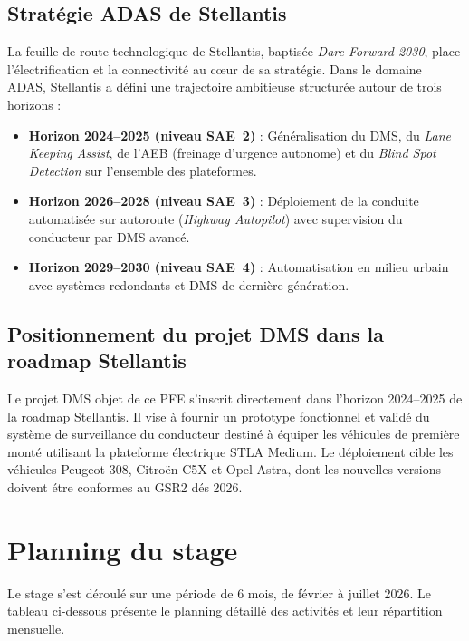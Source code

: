 \documentclass[12pt,a4paper]{report}
\begin{document}
\subsection{Strat\'egie ADAS de Stellantis}

La feuille de route technologique de Stellantis, baptis\'ee \textit{Dare Forward 2030}, place l'\'electrification et la connectivit\'e au c\oe ur de sa strat\'egie. Dans le domaine ADAS, Stellantis a d\'efini une trajectoire ambitieuse structur\'ee autour de trois horizons :

\begin{itemize}
  \item \textbf{Horizon 2024--2025 (niveau SAE~2)} : G\'en\'eralisation du DMS, du \textit{Lane Keeping Assist}, de l'AEB (freinage d'urgence autonome) et du \textit{Blind Spot Detection} sur l'ensemble des plateformes.
  \item \textbf{Horizon 2026--2028 (niveau SAE~3)} : D\'eploiement de la conduite automatis\'ee sur autoroute (\textit{Highway Autopilot}) avec supervision du conducteur par DMS avanc\'e.
  \item \textbf{Horizon 2029--2030 (niveau SAE~4)} : Automatisation en milieu urbain avec syst\`emes redondants et DMS de derni\`ere g\'en\'eration.
\end{itemize}

\subsection{Positionnement du projet DMS dans la roadmap Stellantis}

Le projet DMS objet de ce PFE s'inscrit directement dans l'horizon 2024--2025 de la roadmap Stellantis. Il vise \`a fournir un prototype fonctionnel et valid\'e du syst\`eme de surveillance du conducteur destin\'e \`a \'equiper les v\'ehicules de premi\`ere mont\'e utilisant la plateforme \'electrique STLA Medium. Le d\'eploiement cible les v\'ehicules Peugeot 308, Citro\"en C5X et Opel Astra, dont les nouvelles versions doivent \'etre conformes au GSR2 d\'es 2026.

\section{Planning du stage}

Le stage s'est d\'eroul\'e sur une p\'eriode de 6 mois, de f\'evrier \`a juillet 2026. Le tableau ci-dessous pr\'esente le planning d\'etaill\'e des activit\'es et leur r\'epartition mensuelle.
\end{document}
